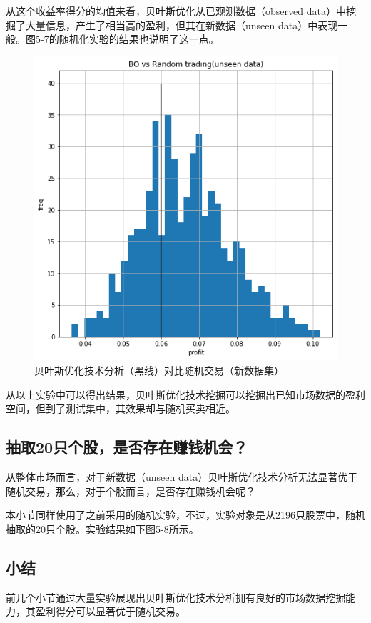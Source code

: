 \documentclass[twoside,longtitle]{LZUthesis}
\begin{document}
从这个收益率得分的均值来看，贝叶斯优化从已观测数据（observed data）中挖掘了大量信息，产生了相当高的盈利，但其在新数据（unseen data）中表现一般。图5-7的随机化实验的结果也说明了这一点。

\begin{figure}[h]
    \centering
    \includegraphics[scale=0.7]{fig5-7.png}
    \caption{贝叶斯优化技术分析（黑线）对比随机交易（新数据集）}
    \label{fig:my_label}
\end{figure}

从以上实验中可以得出结果，贝叶斯优化技术挖掘可以挖掘出已知市场数据的盈利空间，但到了测试集中，其效果却与随机买卖相近。

\subsection{抽取20只个股，是否存在赚钱机会？}
从整体市场而言，对于新数据（unseen data）贝叶斯优化技术分析无法显著优于随机交易，那么，对于个股而言，是否存在赚钱机会呢？

本小节同样使用了之前采用的随机实验，不过，实验对象是从2196只股票中，随机抽取的20只个股。实验结果如下图5-8所示。

\subsection{小结}
前几个小节通过大量实验展现出贝叶斯优化技术分析拥有良好的市场数据挖掘能力，其盈利得分可以显著优于随机交易。
\end{document}
